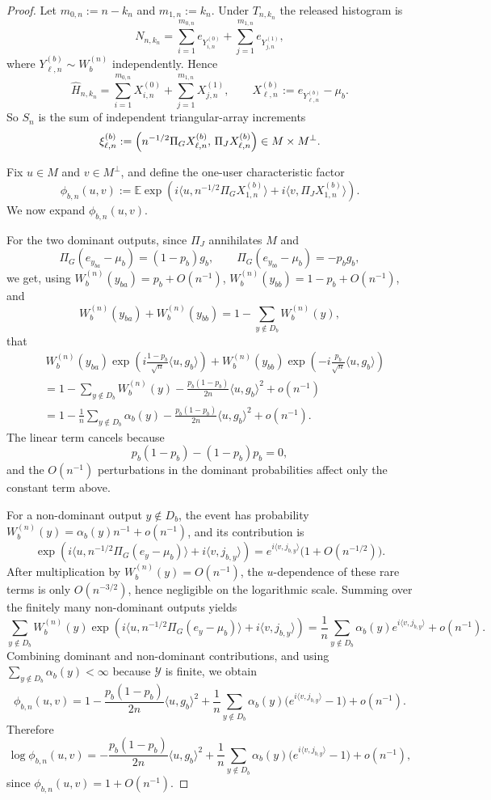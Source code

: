 \documentclass{article}
\begin{document}
\begin{proof}
Let $m_{0,n}:=n-k_n$ and $m_{1,n}:=k_n$. Under $T_{n,k_n}$ the released histogram is
\[
N_{n,k_n}=\sum_{i=1}^{m_{0,n}} e_{Y^{(0)}_{i,n}}+\sum_{j=1}^{m_{1,n}} e_{Y^{(1)}_{j,n}},
\]
where $Y^{(b)}_{\ell,n}\sim W_b^{(n)}$ independently. Hence
\[
\widehat H_{n,k_n}
=\sum_{i=1}^{m_{0,n}}X^{(0)}_{i,n}+\sum_{j=1}^{m_{1,n}}X^{(1)}_{j,n},
\qquad
X^{(b)}_{\ell,n}:=e_{Y^{(b)}_{\ell,n}}-\mu_b.
\]
So $S_n$ is the sum of independent triangular-array increments
\[
\xi^{(b)}_{\ell,n}:=\Bigl(n^{-1/2}\Pi_G X^{(b)}_{\ell,n},\,\Pi_J X^{(b)}_{\ell,n}\Bigr)
\in M\times M^\perp.
\]

Fix $u\in M$ and $v\in M^\perp$, and define the one-user characteristic factor
\[
\phi_{b,n}(u,v)
:=\mathbb E\exp\!\left(i\big\langle u,n^{-1/2}\Pi_G X^{(b)}_{1,n}\big\rangle
+i\big\langle v,\Pi_J X^{(b)}_{1,n}\big\rangle\right).
\]
We now expand $\phi_{b,n}(u,v)$.

For the two dominant outputs, since $\Pi_J$ annihilates $M$ and
\[
\Pi_G(e_{y_{ba}}-\mu_b)=(1-p_b)g_b,
\qquad
\Pi_G(e_{y_{bb}}-\mu_b)=-p_b g_b,
\]
we get, using $W_b^{(n)}(y_{ba})=p_b+O(n^{-1})$, $W_b^{(n)}(y_{bb})=1-p_b+O(n^{-1})$, and
\[
W_b^{(n)}(y_{ba})+W_b^{(n)}(y_{bb})=1-\sum_{y\notin D_b}W_b^{(n)}(y),
\]
that
\begin{align*}
&\,W_b^{(n)}(y_{ba})
\exp\!\left(i\frac{1-p_b}{\sqrt n}\langle u,g_b\rangle\right)
+W_b^{(n)}(y_{bb})
\exp\!\left(-i\frac{p_b}{\sqrt n}\langle u,g_b\rangle\right) \\
&=1-\sum_{y\notin D_b}W_b^{(n)}(y)
  -\frac{p_b(1-p_b)}{2n}\langle u,g_b\rangle^2+o(n^{-1}) \\
&=1-\frac1n\sum_{y\notin D_b}\alpha_b(y)
  -\frac{p_b(1-p_b)}{2n}\langle u,g_b\rangle^2+o(n^{-1}).
\end{align*}
The linear term cancels because
\[
p_b(1-p_b)-(1-p_b)p_b=0,
\]
and the $O(n^{-1})$ perturbations in the dominant probabilities affect only the constant term above.

For a non-dominant output $y\notin D_b$, the event has probability
$W_b^{(n)}(y)=\alpha_b(y)n^{-1}+o(n^{-1})$, and its contribution is
\[
\exp\!\left(i\big\langle u,n^{-1/2}\Pi_G(e_y-\mu_b)\big\rangle
+i\big\langle v,j_{b,y}\big\rangle\right)
=e^{i\langle v,j_{b,y}\rangle}\bigl(1+O(n^{-1/2})\bigr).
\]
After multiplication by $W_b^{(n)}(y)=O(n^{-1})$, the $u$-dependence of these rare terms is only
$O(n^{-3/2})$, hence negligible on the logarithmic scale. Summing over the finitely many non-dominant
outputs yields
\[
\sum_{y\notin D_b}W_b^{(n)}(y)
\exp\!\left(i\big\langle u,n^{-1/2}\Pi_G(e_y-\mu_b)\big\rangle
+i\big\langle v,j_{b,y}\big\rangle\right)
=\frac1n\sum_{y\notin D_b}\alpha_b(y)e^{i\langle v,j_{b,y}\rangle}+o(n^{-1}).
\]
Combining dominant and non-dominant contributions, and using
$\sum_{y\notin D_b}\alpha_b(y)<\infty$ because $\mathcal Y$ is finite, we obtain
\[
\phi_{b,n}(u,v)
=1-\frac{p_b(1-p_b)}{2n}\langle u,g_b\rangle^2
+\frac1n\sum_{y\notin D_b}\alpha_b(y)\bigl(e^{i\langle v,j_{b,y}\rangle}-1\bigr)
+o(n^{-1}).
\]
Therefore
\[
\log\phi_{b,n}(u,v)
=-\frac{p_b(1-p_b)}{2n}\langle u,g_b\rangle^2
+\frac1n\sum_{y\notin D_b}\alpha_b(y)\bigl(e^{i\langle v,j_{b,y}\rangle}-1\bigr)
+o(n^{-1}),
\]
since $\phi_{b,n}(u,v)=1+O(n^{-1})$.


\end{proof}
\end{document}
